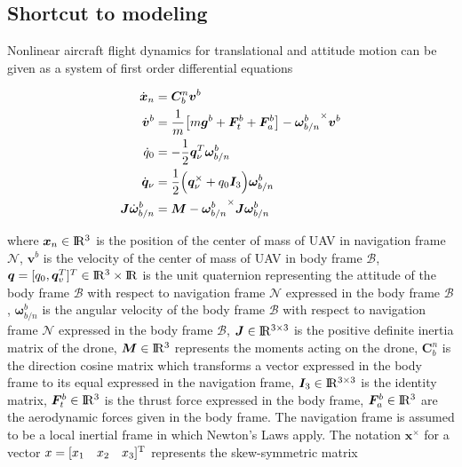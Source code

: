 \subsection{Shortcut to modeling}

Nonlinear aircraft flight dynamics for translational and attitude motion can be given as a system of first order differential equations 

\begin{align}{\label{eqn:compactEquOfMotion}}
\begin{split}
\dot{\bm{x}}_{n} &= \bm{C}_b^n \bm{v}^b\\
\dot{\bm{v}}^b &= \frac{1}{m} \big[ m \bm{g}^b + \bm{F}_t^b + \bm{F}_a^b \big] - {\bm{\omega}_{b/n}^b}^\times \bm{v}^b  \\
\dot{q}_0 &= -\frac{1}{2} \bm{q}_\nu^T \bm{\omega}_{b/n}^b\\
\dot{\bm{q}}_\nu &= \frac{1}{2}\Big(\bm{q}_\nu^\times + q_0 \bm{I}_3 \Big) \bm{\omega}_{b/n}^b \\
\bm{J} \dot{\bm{\omega}}_{b/n}^b &= \bm{M} - {\bm{\omega}_{b/n}^b}^\times \bm{J} \bm{\omega}_{b/n}^b\\
\end{split}
\end{align}

where $\bm{x}_{n} \in {\rm I\!R^3}  $ is the position of the center of mass of UAV in navigation frame $\mathcal{N}$, $\bm{v}^b$ is the velocity of the center of mass of UAV in body frame $\mathcal{B}$,  $\bm{q} = [q_0, \bm{q}_v^T] ^T \in {\rm I\!R^3} \times {\rm I\!R}$ is the unit quaternion representing the attitude of the body frame $\mathcal{B}$ with respect to navigation frame $\mathcal{N}$ expressed in the body frame $\mathcal{B}$, $\bm{\omega}_{b/n}^b$ is the angular velocity of the body frame $\mathcal{B}$ with respect to navigation frame $\mathcal{N}$ expressed in the body frame $\mathcal{B}$, $ \bm{J} \in {\rm I\!R^{3\times3}}  $ is the positive definite inertia matrix of the drone, $\bm{M} \in {\rm I\!R^3}$ represents the moments acting on the drone, $ \bm{C}_b^n$ is the direction cosine matrix which transforms a vector expressed in the body frame to its equal expressed in the navigation frame, $\bm{I}_3  \in {\rm I\!R^{3\times3}}$ is the identity matrix, $\bm{F}_t^b \in {\rm I\!R^3}$ is the thrust force expressed in the body frame,  $\bm{F}_a^b \in {\rm I\!R^3}$ are the aerodynamic forces given in the body frame. 
The navigation frame is assumed to be a local inertial frame in which Newton's Laws apply. 
The notation $\bm{x} ^{\times} $ for a vector $x = [x_1 \quad x_2 \quad x_3]^ {\rm{T}}$ represents the skew-symmetric matrix

